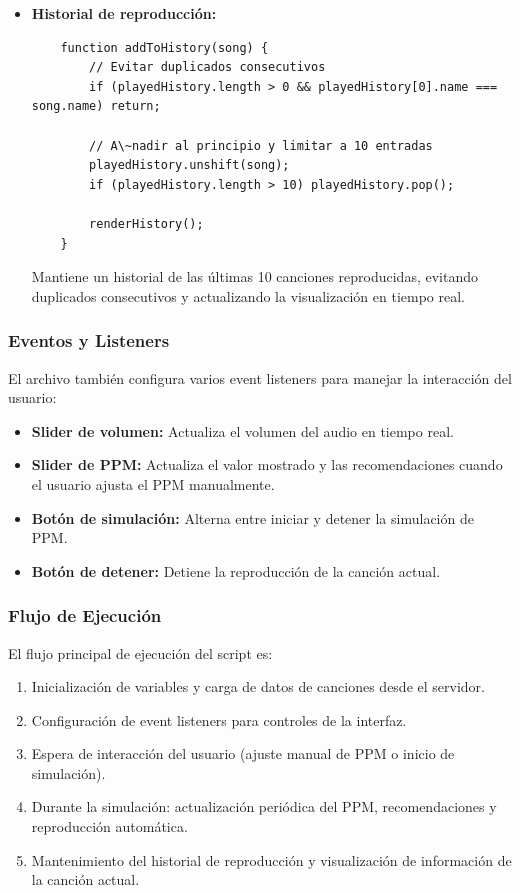 \documentclass[a4paper,12pt]{article}
\begin{document}
\begin{itemize}
    \item \textbf{Historial de reproducción:}
    \begin{verbatim}
    function addToHistory(song) {
        // Evitar duplicados consecutivos
        if (playedHistory.length > 0 && playedHistory[0].name === song.name) return;
        
        // A\~nadir al principio y limitar a 10 entradas
        playedHistory.unshift(song);
        if (playedHistory.length > 10) playedHistory.pop();
        
        renderHistory();
    }
    \end{verbatim}
    Mantiene un historial de las últimas 10 canciones reproducidas, evitando duplicados consecutivos y actualizando la visualización en tiempo real.
\end{itemize}

\subsubsection{Eventos y Listeners}
El archivo también configura varios event listeners para manejar la interacción del usuario:

\begin{itemize}
    \item \textbf{Slider de volumen:} Actualiza el volumen del audio en tiempo real.
    \item \textbf{Slider de PPM:} Actualiza el valor mostrado y las recomendaciones cuando el usuario ajusta el PPM manualmente.
    \item \textbf{Botón de simulación:} Alterna entre iniciar y detener la simulación de PPM.
    \item \textbf{Botón de detener:} Detiene la reproducción de la canción actual.
\end{itemize}

\subsubsection{Flujo de Ejecución}
El flujo principal de ejecución del script es:

\begin{enumerate}
    \item Inicialización de variables y carga de datos de canciones desde el servidor.
    \item Configuración de event listeners para controles de la interfaz.
    \item Espera de interacción del usuario (ajuste manual de PPM o inicio de simulación).
    \item Durante la simulación: actualización periódica del PPM, recomendaciones y reproducción automática.
    \item Mantenimiento del historial de reproducción y visualización de información de la canción actual.
\end{enumerate}
\end{document}
